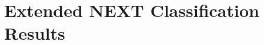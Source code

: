\begingroup

\renewcommand{\arraystretch}{1}





\clearpage
\section{Extended NEXT Classification Results}
\label{app:next-results}

\FloatBarrier
\endgroup
